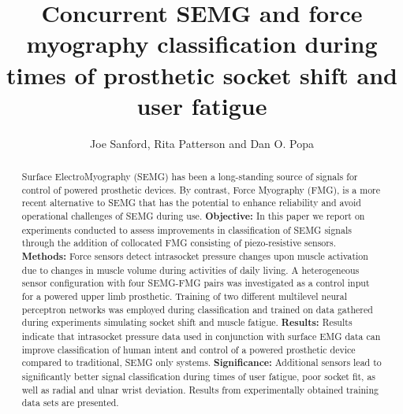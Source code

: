 \documentclass[twocolumn]{sagej}
\begin{document}
%


\title{Concurrent SEMG and force myography classification during times of prosthetic socket shift and user fatigue}

\author{Joe Sanford, Rita Patterson and Dan O. Popa}




\begin{abstract}
Surface ElectroMyography (SEMG) has been a long-standing source of signals for control of powered prosthetic devices. By contrast, Force Myography (FMG),  is a more recent alternative to SEMG that has the potential to enhance reliability and avoid operational challenges of SEMG during use. \textbf{Objective:} In this paper we report on experiments  conducted to assess improvements in classification of SEMG signals through  the addition of  collocated  FMG consisting of piezo-resistive  sensors. \textbf{Methods:} Force  sensors detect intrasocket pressure changes upon muscle activation  due to changes in muscle volume during activities of daily living. A heterogeneous sensor configuration  with four SEMG-FMG pairs was investigated as a control input for a powered upper limb prosthetic. Training of two different multilevel neural perceptron networks was employed during classification and trained on data  gathered during experiments simulating socket shift and muscle fatigue. \textbf{Results:} Results indicate that intrasocket  pressure data used in conjunction with surface EMG data can improve classification of human intent and control of a powered prosthetic device compared to traditional, SEMG only systems. \textbf{Significance:} Additional sensors lead to significantly better signal classification during times of user fatigue, poor socket fit, as well as radial and ulnar wrist deviation.  Results from experimentally obtained training data sets are presented.
\end{abstract}
\end{document}
